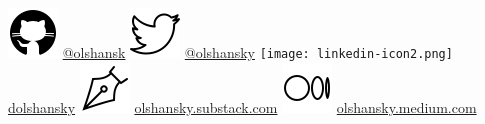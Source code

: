 \documentclass[
    11pt, %
]{resume} %
\newcommand{\Hquad}{\hspace{0.5em}}
\begin{document}
\begin{center}
    \includegraphics[scale=0.25]{github-icon.png} \href{https://github.com/olshansk}{@olshansk} \Hquad
    \includegraphics[scale=0.25]{twitter-icon.png} \href{https://twitter.com/olshansky}{@olshansky}
    \Hquad
    \texttt{[image: linkedin-icon2.png]} \href{https://www.linkedin.com/in/dolshansky/}{dolshansky}
    \Hquad
    \includegraphics[scale=0.25]{substack-icon.png} \href{https://olshansky.substack.com}{olshansky.substack.com}
    \Hquad
    \includegraphics[scale=0.25]{medium-icon.png} \href{https://olshansky.medium.com}{olshansky.medium.com}
\end{center}



\end{document}
